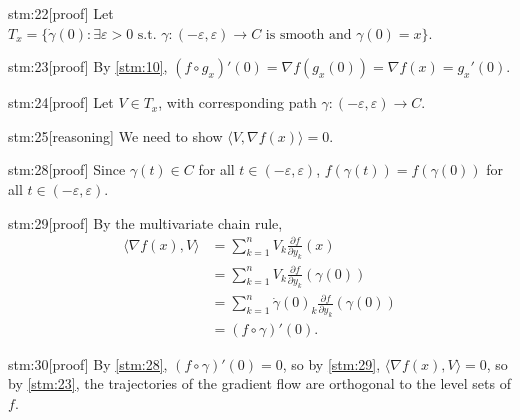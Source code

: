 \begin{stm}{stm:22}[proof]
Let $T_x = \{ \dot{\gamma}(0) : \exists \varepsilon > 0 \text{ s.t. } \gamma : (-\varepsilon, \varepsilon) \to C \text{ is smooth and } \gamma(0) = x \}$.
\end{stm}

\begin{stm}{stm:23}[proof]
By \ref{stm:10}, $(f \circ g_x)'(0) = \nabla f(g_x(0)) = \nabla f(x) = g_x'(0)$.
\end{stm}

\begin{stm}{stm:24}[proof]
Let $V \in T_x$, with corresponding path $\gamma : (-\varepsilon, \varepsilon) \to C$.
\end{stm}

\begin{stm}{stm:25}[reasoning]
We need to show $\langle V, \nabla f(x) \rangle = 0$.
\end{stm}

\begin{stm}{stm:28}[proof]
Since $\gamma(t) \in C$ for all $t \in (-\varepsilon, \varepsilon)$, $f(\gamma(t)) = f(\gamma(0))$ for all $t \in (-\varepsilon, \varepsilon)$. 
\end{stm}

\begin{stm}{stm:29}[proof]
By the multivariate chain rule,
\begin{align*}
\langle \nabla f(x), V \rangle 
&= \sum_{k=1}^n V_k \frac{\partial f}{\partial y_k}(x) \\
&= \sum_{k=1}^n V_k \frac{\partial f}{\partial y_k}(\gamma(0)) \\
&= \sum_{k=1}^n \dot{\gamma}(0)_k \frac{\partial f}{\partial y_k}(\gamma(0)) \\
&= (f \circ \gamma)'(0).
\end{align*}
\end{stm}

\begin{stm}{stm:30}[proof]
By \ref{stm:28}, $(f \circ \gamma)'(0) = 0$, so by \ref{stm:29}, $\langle \nabla f(x), V \rangle = 0$, so by \ref{stm:23}, the trajectories of the gradient flow are orthogonal to the level sets of $f$.
\end{stm}